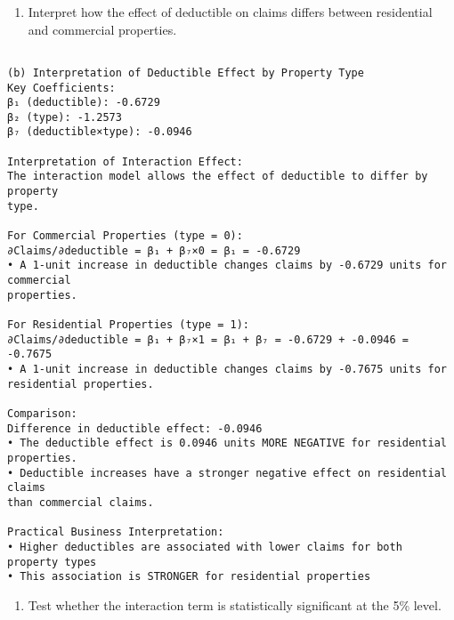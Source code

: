 \documentclass[8pt, twocolumn]{extarticle}
\providecommand{\tightlist}{%
      \setlength{\itemsep}{0pt}\setlength{\parskip}{0pt}}
\begin{document}
    \begin{enumerate}
\def\labelenumi{(\alph{enumi})}
\setcounter{enumi}{1}
\tightlist
\item
  Interpret how the effect of deductible on claims differs between
  residential and commercial properties.
\end{enumerate}

    \begin{Verbatim}[commandchars=\\\{\}]

(b) Interpretation of Deductible Effect by Property Type
Key Coefficients:
β₁ (deductible): -0.6729
β₂ (type): -1.2573
β₇ (deductible×type): -0.0946

Interpretation of Interaction Effect:
The interaction model allows the effect of deductible to differ by property
type.

For Commercial Properties (type = 0):
∂Claims/∂deductible = β₁ + β₇×0 = β₁ = -0.6729
• A 1-unit increase in deductible changes claims by -0.6729 units for commercial
properties.

For Residential Properties (type = 1):
∂Claims/∂deductible = β₁ + β₇×1 = β₁ + β₇ = -0.6729 + -0.0946 = -0.7675
• A 1-unit increase in deductible changes claims by -0.7675 units for
residential properties.

Comparison:
Difference in deductible effect: -0.0946
• The deductible effect is 0.0946 units MORE NEGATIVE for residential
properties.
• Deductible increases have a stronger negative effect on residential claims
than commercial claims.

Practical Business Interpretation:
• Higher deductibles are associated with lower claims for both property types
• This association is STRONGER for residential properties
    \end{Verbatim}

    \begin{enumerate}
\def\labelenumi{(\alph{enumi})}
\setcounter{enumi}{2}
\tightlist
\item
  Test whether the interaction term is statistically significant at the
  5\% level.
\end{enumerate}
\end{document}

